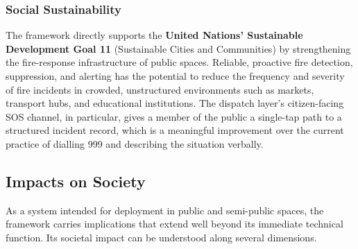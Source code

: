 \subsubsection{Social Sustainability}
The framework directly supports the \textbf{United Nations' Sustainable Development Goal 11} (Sustainable Cities and Communities) by strengthening the fire-response infrastructure of public spaces. Reliable, proactive fire detection, suppression, and alerting has the potential to reduce the frequency and severity of fire incidents in crowded, unstructured environments such as markets, transport hubs, and educational institutions. The dispatch layer's citizen-facing SOS channel, in particular, gives a member of the public a single-tap path to a structured incident record, which is a meaningful improvement over the current practice of dialling 999 and describing the situation verbally.

\subsection{Impacts on Society}

As a system intended for deployment in public and semi-public spaces, the framework carries implications that extend well beyond its immediate technical function. Its societal impact can be understood along several dimensions.

